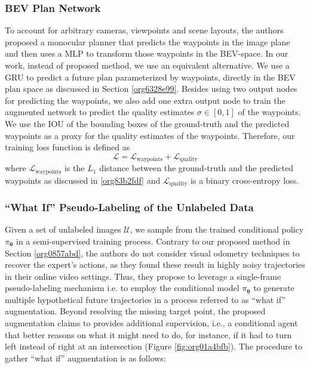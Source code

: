 \documentclass[letterpaper, 12pt]{book}
\theoremstyle{definition}
\theoremstyle{definition}
\theoremstyle{definition}
\theoremstyle{definition}
\theoremstyle{definition}
\newcommand{\vth}{\boldsymbol{\theta}}
\begin{document}
\subsubsection{BEV Plan Network}
\label{sec:orgf2d6dd1}
To account for arbitrary cameras, viewpoints and scene layouts, the authors
proposed a monocular planner that predicts the waypoints in the image plane and
then uses a MLP to transform those waypoints in the BEV-space. In our work,
instead of proposed method, we use an equivalent alternative. We use a GRU to
predict a future plan parameterized by waypoints, directly in the BEV plan space
as discussed in Section \ref{org6328e99}. Besides using two output nodes for predicting the
waypoints, we also add one extra output node to train the augmented network to
predict the quality estimates \(\sigma\in [0,1]\) of the waypoints. We use the IOU
of the bounding boxes of the ground-truth and the predicted waypoints as a proxy
for the quality estimates of the waypoints. Therefore, our training loss
function is defined as \[\mathcal{L}=\mathcal{L}_{\text{waypoints}}+\mathcal{L}_{\text{quality}}\] where
\(\mathcal{L}_{\text{waypoints}}\) is the \(L_{1}\) distance between the ground-truth and
the predicted waypoints as discussed in \ref{org83b2fdf} and \(\mathcal{L}_{\text{quality}}\) is a
binary cross-entropy loss.

\subsubsection{``What If'' Pseudo-Labeling of the Unlabeled Data \label{org9cab8c4}}
\label{sec:orgf63b015}
Given a set of unlabeled images \(\mathcal{U}\), we sample from the trained conditional
policy \(\pi_{\vth}\) in a semi-supervised training process. Contrary to our
proposed method in Section \ref{org0857abd}, the authors do not consider visual odometry
techniques \cite{Wang2017} to recover the expert's actions, as they found these
result in highly noisy trajectories in their online video settings. Thus, they
propose to leverage a single-frame pseudo-labeling mechanism i.e. to employ the
conditional model \(\pi_{\vth}\) to generate multiple hypothetical future
trajectories in a process referred to as ``what if'' augmentation. Beyond
resolving the missing target point, the proposed augmentation claims to provides
additional supervision, i.e., a conditional agent that better reasons on what it
might need to do, for instance, if it had to turn left instead of right at an
intersection (Figure \ref{fig:org01a4bfb}). The procedure to gather ``what if''
augmentation is as follows:
\end{document}

